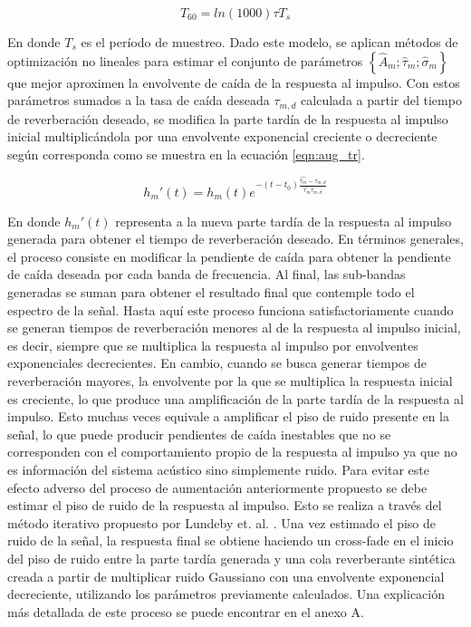\begin{equation}
\label{eqn:tau60}
	T_{60} = ln(1000)\tau T_{s}
\end{equation}

En donde $T_{s}$ es el período de muestreo. Dado este modelo, se aplican métodos de optimización no lineales para estimar el conjunto de parámetros $\left \{ \hat{A}_{m}; \hat{\tau}_{m}; \hat{\sigma}_{m} \right \}$ que mejor aproximen la envolvente de caída de la respuesta al impulso. Con estos parámetros sumados a la tasa de caída deseada $\tau_{m,d}$ calculada a partir del tiempo de reverberación deseado, se modifica la parte tardía de la respuesta al impulso inicial multiplicándola por una envolvente exponencial creciente o decreciente según corresponda como se muestra en la ecuación  \ref{eqn:aug_tr}.

\begin{equation}
\label{eqn:aug_tr}
	{h_{m}}'(t) = h_{m}(t) e^{-(t-t_{0})\frac{\hat{\tau_{m}}-\tau_{m,d}}{\hat{\tau_{m}}\tau_{m,d}}}
\end{equation}

En donde ${h_{m}}'(t)$ representa a la nueva parte tardía de la respuesta al impulso generada para obtener el tiempo de reverberación deseado. En términos generales, el proceso consiste en modificar la pendiente de caída para obtener la pendiente de caída deseada por cada banda de frecuencia. Al final, las sub-bandas generadas se suman para obtener el resultado final que contemple todo el espectro de la señal. Hasta aquí este proceso funciona satisfactoriamente cuando se generan tiempos de reverberación menores al de la respuesta al impulso inicial, es decir, siempre que se multiplica la respuesta al impulso por envolventes exponenciales decrecientes. En cambio, cuando se busca generar tiempos de reverberación mayores, la envolvente por la que se multiplica la respuesta inicial es creciente, lo que produce una amplificación de la parte tardía de la respuesta al impulso. Esto muchas veces equivale a amplificar el piso de ruido presente en la señal, lo que puede producir pendientes de caída inestables que no se corresponden con el comportamiento propio de la respuesta al impulso ya que no es información del sistema acústico sino simplemente ruido. Para evitar este efecto adverso del proceso de aumentación anteriormente propuesto se debe estimar el piso de ruido de la respuesta al impulso. Esto se realiza a través del método iterativo propuesto por Lundeby et. al. \cite{Lundeby}. Una vez estimado el piso de ruido de la señal, la respuesta final se obtiene haciendo un cross-fade en el inicio del piso de ruido entre la parte tardía generada y una cola reverberante sintética creada a partir de multiplicar ruido Gaussiano con una envolvente exponencial decreciente, utilizando los parámetros previamente calculados. Una explicación más detallada de este proceso se puede encontrar en el anexo A. 

